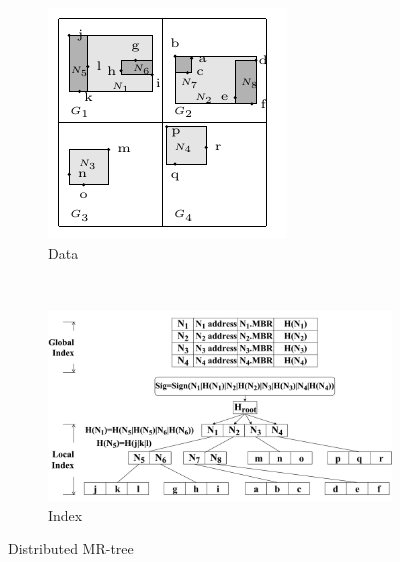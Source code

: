 \begin{figure}[t]
  \centering
  \begin{subfigure}[b]{.35\linewidth}
    \centering
    \includegraphics[width=\linewidth]{figs/knn/distributed-mrtree-data.pdf}
    \caption{Data}\label{fig:knn:distributed-mrtree:data}
  \end{subfigure}~%
  \begin{subfigure}[b]{.65\linewidth}
    \centering
    \includegraphics[width=\linewidth]{figs/knn/distributed-mrtree-tree.pdf}
    \caption{Index}\label{fig:knn:distributed-mrtree:tree}
  \end{subfigure}
  \caption{Distributed MR-tree}\label{fig:knn:distributed-mrtree}
\end{figure}

